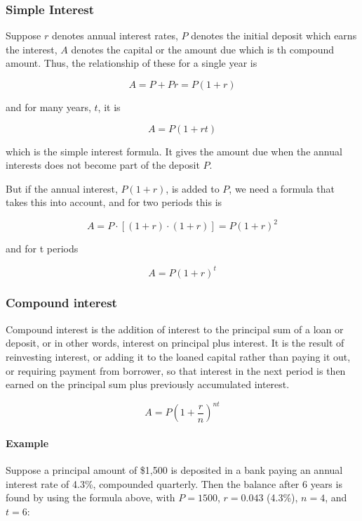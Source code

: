 \documentclass[
  12pt,
  oneside]{book}
\theoremstyle{definition}
\theoremstyle{definition}
\theoremstyle{definition}
\theoremstyle{definition}
\theoremstyle{remark}
\begin{document}
\hypertarget{simple-interest}{%
\subsubsection{Simple Interest}\label{simple-interest}}

Suppose \(r\) denotes annual interest rates, \(P\) denotes the initial deposit which earns the interest, \(A\) denotes the capital or the amount due which is th compound amount. Thus, the relationship of these for a single year is

\[
A=P+Pr=P(1+r)
\]

and for many years, \(t\), it is

\[
A=P(1+rt)
\]

which is the simple interest formula. It gives the amount due when the annual interests does not become part of the deposit \(P\).

But if the annual interest, \(P(1+r)\), is added to \(P\), we need a formula that takes this into account, and for two periods this is

\[
A=P\cdot  [(1+r)\cdot(1+r)]=P(1+r)^2
\]

and for t periods

\[
A=P(1+r)^t
\]

\hypertarget{compound-interest}{%
\subsubsection{Compound interest}\label{compound-interest}}

Compound interest is the addition of interest to the principal sum of a loan or deposit, or in other words, interest on principal plus interest. It is the result of reinvesting interest, or adding it to the loaned capital rather than paying it out, or requiring payment from borrower, so that interest in the next period is then earned on the principal sum plus previously accumulated interest.

\[
A=P\left(1+\frac{r}{n}\right)^{nt}
\]

\hypertarget{example}{%
\paragraph*{Example}\label{example}}

Suppose a principal amount of \$1,500 is deposited in a bank paying an annual interest rate of 4.3\%, compounded quarterly. Then the balance after 6 years is found by using the formula above, with \(P = 1500\), \(r = 0.043\) (4.3\%), \(n = 4\), and \(t = 6\):
\end{document}

